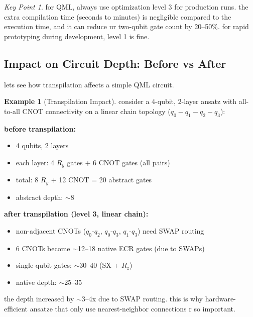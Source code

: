 \documentclass[11pt,a4paper]{article}
\theoremstyle{definition}
\newtheorem{example}{Example}[section]
\theoremstyle{remark}
\newtheorem*{keypoint}{Key Point}
\begin{document}
\begin{keypoint}
for QML, always use optimization level 3 for production runs. the extra compilation time (seconds to minutes) is negligible compared to the execution time, and it can reduce ur two-qubit gate count by 20--50\%. for rapid prototyping during development, level 1 is fine.
\end{keypoint}

\subsection{Impact on Circuit Depth: Before vs After}

lets see how transpilation affects a simple QML circuit.

\begin{example}[Transpilation Impact]
consider a 4-qubit, 2-layer ansatz with all-to-all CNOT connectivity on a linear chain topology ($q_0 - q_1 - q_2 - q_3$):

\textbf{before transpilation:}
\begin{itemize}[leftmargin=*]
    \item 4 qubits, 2 layers
    \item each layer: 4 $R_y$ gates + 6 CNOT gates (all pairs)
    \item total: 8 $R_y$ + 12 CNOT = 20 abstract gates
    \item abstract depth: $\sim$8
\end{itemize}

\textbf{after transpilation (level 3, linear chain):}
\begin{itemize}[leftmargin=*]
    \item non-adjacent CNOTs ($q_0$-$q_2$, $q_0$-$q_3$, $q_1$-$q_3$) need SWAP routing
    \item 6 CNOTs become $\sim$12--18 native ECR gates (due to SWAPs)
    \item single-qubit gates: $\sim$30--40 (SX + $R_z$)
    \item native depth: $\sim$25--35
\end{itemize}

the depth increased by $\sim$3--4x due to SWAP routing. this is why hardware-efficient ansatze that only use nearest-neighbor connections r so important.
\end{example}
\end{document}

